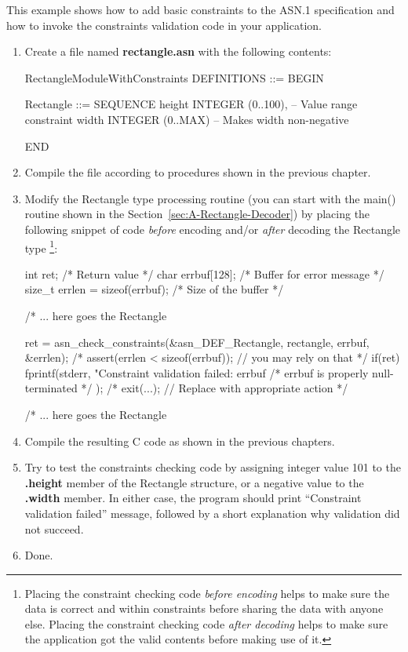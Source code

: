 \documentclass[english,oneside,12pt]{book}
\begin{document}
This example shows how to add basic constraints to the ASN.1 specification
and how to invoke the constraints validation code in your application.
\begin{enumerate}
\item Create a file named \textbf{rectangle.asn} with the following contents:

\begin{asn}
RectangleModuleWithConstraints DEFINITIONS ::= BEGIN

Rectangle ::= SEQUENCE {
    height  INTEGER (0..100), -- Value range constraint
    width   INTEGER (0..MAX)  -- Makes width non-negative 
}

END
\end{asn}
\item Compile the file according to procedures shown in the previous chapter.
\item Modify the Rectangle type processing routine (you can start with the
main() routine shown in the Section~\ref{sec:A-Rectangle-Decoder})
by placing the following snippet of code \emph{before} encoding and/or
\emph{after} decoding the Rectangle type%
\footnote{Placing the constraint checking code \emph{before encoding} helps
to make sure the data is correct and within constraints before
sharing the data with anyone else.
Placing the constraint checking code \emph{after decoding} helps to make sure
the application got the valid contents before making use of it.%
}:

\begin{codesample}
int ret;           /* Return value */
char errbuf[128];  /* Buffer for error message */
size_t errlen = sizeof(errbuf);  /* Size of the buffer */

/* ... here goes the Rectangle %

ret = asn_check_constraints(&asn_DEF_Rectangle, rectangle, errbuf, &errlen);
/* assert(errlen < sizeof(errbuf)); // you may rely on that */
if(ret) {
    fprintf(stderr, "Constraint validation failed: %
            errbuf   /* errbuf is properly null-terminated */
    );
    /* exit(...); // Replace with appropriate action */
 }

/* ... here goes the Rectangle %
\end{codesample}
\item Compile the resulting C code as shown in the previous chapters.
\item Try to test the constraints checking code by assigning integer value
101 to the \textbf{.height} member of the Rectangle structure, or
a negative value to the \textbf{.width} member. In either case, the
program should print ``Constraint validation failed'' message, followed
by a short explanation why validation did not succeed.
\item Done.
\end{enumerate}
\end{document}

